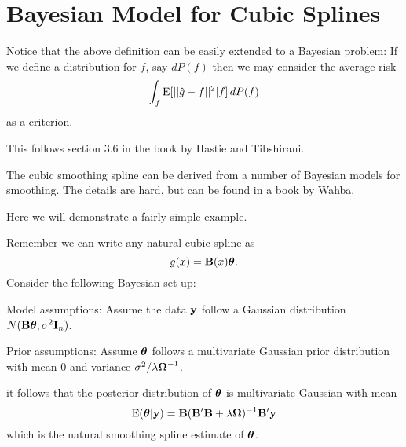 \section{Bayesian Model for Cubic Splines}
Notice that the above definition can be easily extended to a Bayesian
problem: If we define a distribution for $f$, say $dP(f)$ then we may
consider the average risk
\[
\int_f  \mbox{E} [ || \hat{g} - f ||^2 | f] \, dP(f)
\]
as a criterion. 

This follows section 3.6 in the book by Hastie and Tibshirani.

The cubic smoothing spline can be derived from a number of Bayesian
models for smoothing. The details are hard, but can be found in a book
by Wahba.

Here we will demonstrate a fairly simple example.

Remember we can write any natural cubic spline as 
\[
g(x) = {\mathbf B}(x) \mbox{\boldmath $\theta$\unboldmath}.
\]
Consider the following Bayesian set-up:

Model assumptions: Assume the data ${\mathbf y}$ follow a Gaussian distribution $N({\mathbf B}
\mbox{\boldmath $\theta$\unboldmath}, \sigma^2 {\mathbf I}_n)$. 

Prior assumptions: Assume $\mbox{\boldmath $\theta$\unboldmath}$ follows a multivariate
Gaussian prior distribution with mean $0$ and variance
$\sigma^2/\lambda  \mbox{\boldmath $\Omega$\unboldmath}^{-1}$. 

it follows that the posterior distribution of $\mbox{\boldmath $\theta$\unboldmath}$ is
multivariate Gaussian with mean 
\[
\mbox{E}(\mbox{\boldmath $\theta$\unboldmath}|{\mathbf y}) = {\mathbf B}({\mathbf B}'{\mathbf B} +  \lambda \mbox{\boldmath $\Omega$\unboldmath})^{-1} {\mathbf B}'{\mathbf y}
\]
which is the natural smoothing spline estimate of $\mbox{\boldmath $\theta$\unboldmath}$.







